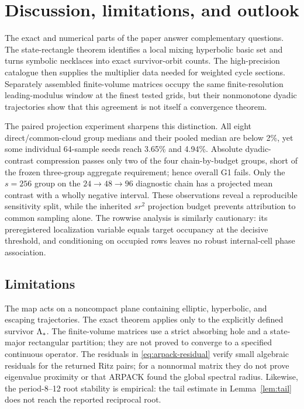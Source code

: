 \section{Discussion, limitations, and outlook}
\label{sec:discussion}

The exact and numerical parts of the paper answer complementary questions.
The state-rectangle theorem identifies a local mixing hyperbolic basic set and
turns symbolic necklaces into exact survivor-orbit counts.  The high-precision
catalogue then supplies the multiplier data needed for weighted cycle
sections.  Separately assembled finite-volume matrices occupy the same
finite-resolution leading-modulus window at the finest tested grids, but their
nonmonotone dyadic trajectories show that this agreement is not itself a
convergence theorem.

The paired projection experiment sharpens this distinction.  All eight
direct/common-cloud group medians and their pooled median are below 2\%, yet some
individual 64-sample seeds reach 3.65\% and 4.94\%.  Absolute dyadic-contrast
compression passes only two of the four chain-by-budget groups, short of the
frozen three-group aggregate requirement; hence overall G1 fails.  Only the
$s=256$ group on the $24\to48\to96$ diagnostic chain has a projected mean
contrast with a wholly negative interval.  These observations reveal a
reproducible sensitivity split, while the inherited $sr^2$ projection budget
prevents attribution to common sampling alone.  The rowwise analysis is
similarly cautionary: its
preregistered localization variable equals target occupancy at the decisive
threshold, and conditioning on occupied rows leaves no robust internal-cell
phase association.

\subsection{Limitations}

The map acts on a noncompact plane containing elliptic, hyperbolic, and
escaping trajectories.  The exact theorem applies only to the explicitly
defined survivor $\Lambda_*$.  The finite-volume matrices use a strict absorbing
hole and a state-major rectangular partition; they are not proved to converge
to a specified continuous operator.  The residuals in
\eqref{eq:arpack-residual} verify small algebraic residuals for the returned
Ritz pairs; for a nonnormal matrix they do not prove eigenvalue proximity or
that ARPACK found the global spectral radius.  Likewise,
the period-8--12 root stability is empirical: the tail estimate in
Lemma~\ref{lem:tail} does not reach the reported reciprocal root.

